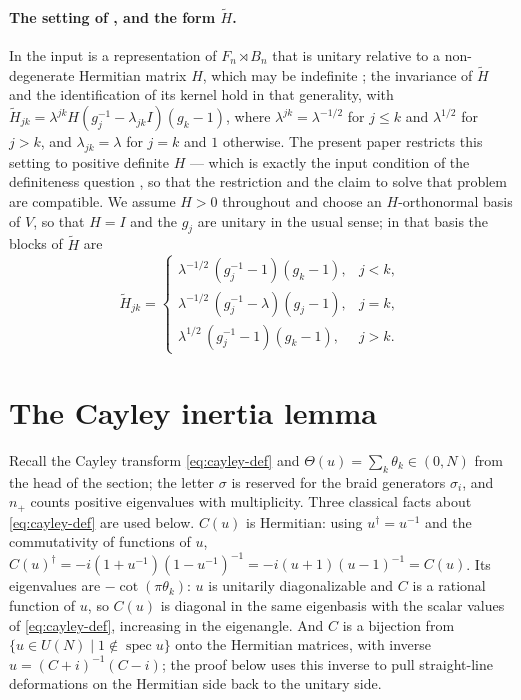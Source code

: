 \documentclass[11pt]{article}
\theoremstyle{definition}
\newcommand{\Ht}{\widetilde H}
\begin{document}
\paragraph{The setting of \cite{N-KLM}, and the form $\Ht$.} In
\cite{N-KLM} the input is a representation of $F_n\rtimes B_n$ that
is unitary relative to a non-degenerate Hermitian matrix $H$, which
may be indefinite \cite[Def.~7]{N-KLM}; the invariance of $\Ht$ and
the identification of its kernel \cite[Thms.~8, 9]{N-KLM} hold in
that generality, with
$\Ht_{jk}=\lambda^{jk}H(g_j^{-1}-\lambda_{jk}I)(g_k-1)$, where
$\lambda^{jk}=\lambda^{-1/2}$ for $j\le k$ and $\lambda^{1/2}$ for
$j>k$, and $\lambda_{jk}=\lambda$ for $j=k$ and $1$ otherwise. The
present paper restricts this setting to positive definite $H$ ---
which is exactly the input condition of the definiteness question
\cite[Problem~18]{N-KLM}, so that the restriction and the claim to
solve that problem are compatible. We assume $H>0$ throughout and
choose an $H$-orthonormal basis of $V$, so that $H=I$ and the $g_j$
are unitary in the usual sense; in that basis the blocks of $\Ht$ are
\begin{equation}\label{eq:blocks}
\Ht_{jk}=
\begin{cases}
\lambda^{-1/2}\,(g_j^{-1}-1)(g_k-1), & j<k,\\[1pt]
\lambda^{-1/2}\,(g_j^{-1}-\lambda)(g_j-1), & j=k,\\[1pt]
\lambda^{1/2}\,(g_j^{-1}-1)(g_k-1), & j>k.
\end{cases}
\end{equation}

\section{The Cayley inertia lemma}\label{sec:cayley}

Recall the Cayley transform \eqref{eq:cayley-def} and
$\Theta(u)=\sum_k\theta_k\in(0,N)$ from the head of the section; the
letter $\sigma$ is reserved for the braid generators $\sigma_i$, and
$n_{+}$ counts positive eigenvalues with multiplicity. Three
classical facts about \eqref{eq:cayley-def} are used below. $C(u)$ is
Hermitian: using $u^{\dagger}=u^{-1}$ and the commutativity of
functions of $u$,
$C(u)^{\dagger}=-i(1+u^{-1})(1-u^{-1})^{-1}=-i(u+1)(u-1)^{-1}=C(u)$.
Its eigenvalues are $-\cot(\pi\theta_k)$: $u$ is unitarily
diagonalizable and $C$ is a rational function of $u$, so $C(u)$ is
diagonal in the same eigenbasis with the scalar values of
\eqref{eq:cayley-def}, increasing in the eigenangle. And $C$ is a
bijection from $\{u\in U(N)\mid 1\notin\operatorname{spec}u\}$ onto
the Hermitian matrices, with inverse $u=(C+i)^{-1}(C-i)$; the proof
below uses this inverse to pull straight-line deformations on the
Hermitian side back to the unitary side.
\end{document}
